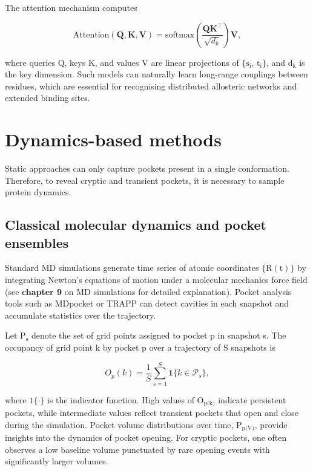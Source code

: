 \documentclass[12pt]{article}
\begin{document}
The attention mechanism computes

\begin{equation}
\mathrm{Attention}(\mathbf{Q}, \mathbf{K}, \mathbf{V}) = \mathrm{softmax} \left( \frac{\mathbf{Q}\mathbf{K}^\top}{\sqrt{d_k}} \right) \mathbf{V},
\label{eq:attention}
\end{equation}

where queries $\textrm{Q}$, keys $\textrm{K}$, and values $\textrm{V}$ are linear projections of $\{\textrm{s}_\textrm{i}$, $\textrm{t}_\textrm{i}\}$, and $\textrm{d}_\textrm{k}$ is the key dimension. Such models can naturally learn long-range couplings between residues, which are essential for recognising distributed allosteric networks and extended binding sites.

\section{Dynamics-based methods}

Static approaches can only capture pockets present in a single conformation. Therefore, to reveal cryptic and transient pockets, it is necessary to sample protein dynamics\cite{CH5_Kuzmanic2020,CH5_Gasparikova2025}. 

\subsection{Classical molecular dynamics and pocket ensembles}

Standard MD simulations generate time series of atomic coordinates $\{\textrm{R}(\textrm{t})\}$ by integrating Newton's equations of motion under a molecular mechanics force field (see \textbf{chapter 9} on MD simulations for detailed explanation). Pocket analysis tools such as MDpocket\cite{CH5_schmidtke2011mdpocket} or TRAPP\cite{CH5_kokh2013trapp} can detect cavities in each snapshot and accumulate statistics over the trajectory.

Let $\textrm{P}_\textrm{s}$ denote the set of grid points assigned to pocket p in snapshot s. The occupancy of grid point k by pocket p over a trajectory of S snapshots is

\begin{equation}
O_{p}(k) = \frac{1}{S} \sum_{s=1}^{S} \mathbf{1}\{k \in \mathcal{P}_s\},
\label{eq:occupancy}
\end{equation}

where $\textrm{1}\{\cdot\}$ is the indicator function. High values of $\textrm{O}_\textrm{p(k)}$ indicate persistent pockets, while intermediate values reflect transient pockets that open and close during the simulation. Pocket volume distributions over time, $\textrm{P}_\textrm{p(V)}$, provide insights into the dynamics of pocket opening. For cryptic pockets, one often observes a low baseline volume punctuated by rare opening events with significantly larger volumes\cite{CH5_Kuzmanic2020}.
\end{document}
